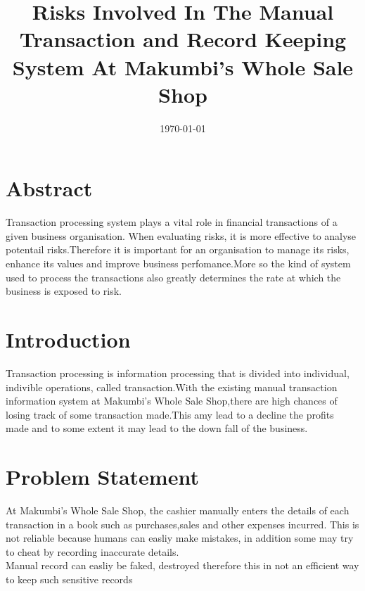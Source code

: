 \documentclass[12pt]{article}
\title{Risks Involved In The Manual Transaction and Record Keeping System At Makumbi's Whole Sale Shop}
\author{}
\date{\today}
\begin{document}
\maketitle

\section*{Abstract}
Transaction processing system plays a vital role in financial transactions of a given business organisation. When evaluating risks, it is more effective to analyse potentail risks.Therefore it is important for an organisation to manage its risks, enhance its values and improve business perfomance.More so the kind of system used to process the transactions also greatly determines the rate at which the business is exposed to risk. 
\section*{Introduction}
Transaction processing is information processing that is divided into individual, indivible operations, called transaction.With the existing manual transaction information system at Makumbi's Whole Sale Shop,there are high chances of losing track of some transaction made.This amy lead to a decline the profits made and to some extent it may lead to the down fall of the business. \\
\section{Problem Statement}
At Makumbi's Whole Sale Shop, the cashier manually enters the details of each transaction in a book such as purchases,sales and other expenses incurred. This is not reliable because humans can easliy make mistakes, in addition some may try to cheat by recording inaccurate details.\\
Manual record can easliy be faked, destroyed therefore this in not an efficient way to keep such sensitive records
\end{document}
